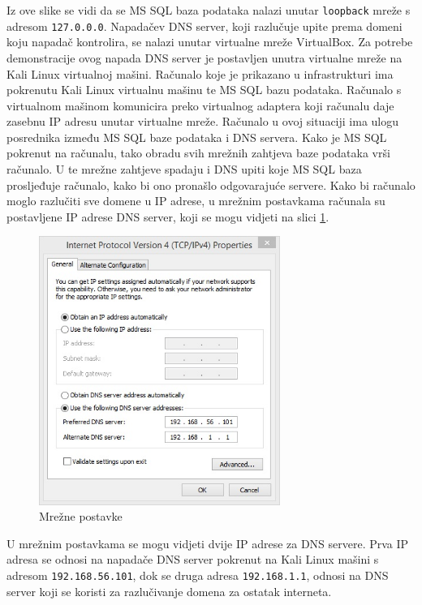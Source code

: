 \documentclass[12pt, oneside, onecolumn]{book}
\begin{document}
{Iz ove slike se vidi da se MS SQL baza podataka nalazi unutar \texttt{loopback} mreže s adresom \texttt{127.0.0.0}. Napadačev DNS server, koji razlučuje upite prema domeni koju napadač kontrolira, se nalazi unutar virtualne mreže VirtualBox. Za potrebe demonstracije ovog napada DNS server je postavljen unutra virtualne mreže na Kali Linux virtualnoj mašini. Računalo koje je prikazano u infrastrukturi ima pokrenutu Kali Linux virtualnu mašinu te MS SQL bazu podataka. Računalo s virtualnom mašinom komunicira preko virtualnog adaptera koji računalu daje zasebnu IP adresu unutar virtualne mreže. Računalo u ovoj situaciji ima ulogu posrednika između MS SQL baze podataka i DNS servera. Kako je MS SQL pokrenut na računalu, tako obradu svih mrežnih zahtjeva baze podataka vrši računalo. U te mrežne zahtjeve spadaju i DNS upiti koje MS SQL baza prosljeđuje računalo, kako bi ono pronašlo odgovarajuće servere. Kako bi računalo moglo razlučiti sve domene u IP adrese, u mrežnim postavkama računala su postavljene IP adrese DNS server, koji se mogu vidjeti na slici \ref{fig:bsqli_ns}.

\begin{figure}[H]
	\begin{center}
		\includegraphics[width=0.7\textwidth]{bsqli_ns.jpg}
		\caption{Mrežne postavke} \label{fig:bsqli_ns}
	\end{center}
\end{figure}

U mrežnim postavkama se mogu vidjeti dvije IP adrese za DNS servere. Prva IP adresa se odnosi na napadače DNS server pokrenut na Kali Linux mašini s adresom \texttt{192.168.56.101}, dok se druga adresa \texttt{192.168.1.1}, odnosi na DNS server koji se koristi za razlučivanje domena za ostatak interneta.

}
\end{document}

